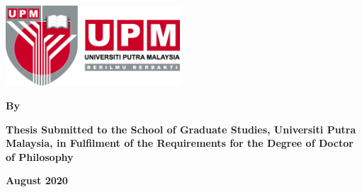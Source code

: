 \begin{titlepage}
\begin{center}
\afterpage{\thispagestyle{empty}}
\includegraphics[angle=0,width=6.5cm,height=3.0cm]{upm.jpeg}

\vspace{15mm}%

\begin{singlespace}
	{\normalsize \bf {\textsc{\thesistitle}}}
	
	\vspace*{40mm}
	
	\bf {\textbf{\normalsize By}}

	\vspace{5mm}

	{\normalsize \bf{\textbf{\textsc{\authorname}}}} 


\vfill

	
	
	{\normalsize \bf Thesis Submitted to the School of Graduate Studies, Universiti Putra Malaysia, in Fulfilment of the Requirements for the Degree of Doctor of Philosophy}
\end{singlespace}

\vspace{5mm}

{\normalsize \bf August 2020}
\end{center}
\end{titlepage}
